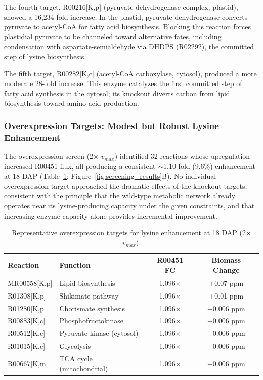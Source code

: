 The fourth target, R00216[K,p] (pyruvate dehydrogenase complex, plastid), showed a 16,234-fold increase. In the plastid, pyruvate dehydrogenase converts pyruvate to acetyl-CoA for fatty acid biosynthesis. Blocking this reaction forces plastidial pyruvate to be channeled toward alternative fates, including condensation with aspartate-semialdehyde via DHDPS (R02292), the committed step of lysine biosynthesis.

The fifth target, R00282[K,c] (acetyl-CoA carboxylase, cytosol), produced a more moderate 28-fold increase. This enzyme catalyzes the first committed step of fatty acid synthesis in the cytosol; its knockout diverts carbon from lipid biosynthesis toward amino acid production.

\subsubsection{Overexpression Targets: Modest but Robust Lysine Enhancement}

The overexpression screen (2$\times$ $v_{max}$) identified 32 reactions whose upregulation increased R00451 flux, all producing a consistent $\sim$1.10-fold (9.6\%) enhancement at 18 DAP (Table~\ref{tab:oe_targets}; Figure~\ref{fig:screening_results}B). No individual overexpression target approached the dramatic effects of the knockout targets, consistent with the principle that the wild-type metabolic network already operates near its lysine-producing capacity under the given constraints, and that increasing enzyme capacity alone provides incremental improvement.

\begin{table}[H]
\centering
\caption{Representative overexpression targets for lysine enhancement at 18 DAP (2$\times$ $v_{max}$).}
\label{tab:oe_targets}
\small
\begin{tabular}{llcc}
\toprule
Reaction & Function & R00451 FC & Biomass Change \\
\midrule
MR00558[K,p] & Lipid biosynthesis & 1.096$\times$ & +0.07 ppm \\
R01308[K,p] & Shikimate pathway & 1.096$\times$ & +0.01 ppm \\
R01280[K,p] & Chorismate synthesis & 1.096$\times$ & +0.006 ppm \\
R00883[K,c] & Phosphofructokinase & 1.096$\times$ & +0.006 ppm \\
R00512[K,c] & Pyruvate kinase (cytosol) & 1.096$\times$ & +0.006 ppm \\
R01015[K,c] & Glycolysis & 1.096$\times$ & +0.006 ppm \\
R00667[K,m] & TCA cycle (mitochondrial) & 1.096$\times$ & +0.006 ppm \\
\bottomrule
\end{tabular}
\end{table}

